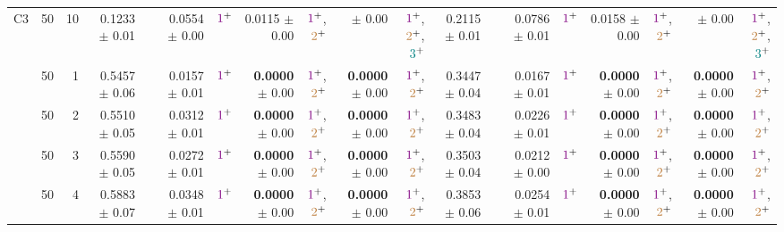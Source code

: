 \begin{table}
\begin{tiny}
\begin{tabular}[t]{rrrrrrrrrrrrrrrrrrr}
\multirow{-10}{*}{\raggedleft\arraybackslash C3} & 50 & 10 & 0.1233 $\pm$ 0.01 &  & 0.0554 $\pm$ 0.00 & $\textcolor{violet}{1}^{+}$ & 0.0115 $\pm$ 0.00 & $\textcolor{violet}{1}^{+}$,$\textcolor{brown}{2}^{+}$ & \cellcolor{gray!0}{\textbf{0.0075}} $\pm$ 0.00 & $\textcolor{violet}{1}^{+}$,$\textcolor{brown}{2}^{+}$,$\textcolor{teal}{3}^{+}$ & 0.2115 $\pm$ 0.01 &  & 0.0786 $\pm$ 0.01 & $\textcolor{violet}{1}^{+}$ & 0.0158 $\pm$ 0.00 & $\textcolor{violet}{1}^{+}$,$\textcolor{brown}{2}^{+}$ & \cellcolor{gray!0}{\textbf{0.0127}} $\pm$ 0.00 & $\textcolor{violet}{1}^{+}$,$\textcolor{brown}{2}^{+}$,$\textcolor{teal}{3}^{+}$\\
\cmidrule{1-19}
 & 50 & 1 & 0.5457 $\pm$ 0.06 &  & 0.0157 $\pm$ 0.01 & $\textcolor{violet}{1}^{+}$ & \textbf{0.0000} $\pm$ 0.00 & $\textcolor{violet}{1}^{+}$,$\textcolor{brown}{2}^{+}$ & \textbf{0.0000} $\pm$ 0.00 & $\textcolor{violet}{1}^{+}$,$\textcolor{brown}{2}^{+}$ & 0.3447 $\pm$ 0.04 &  & 0.0167 $\pm$ 0.01 & $\textcolor{violet}{1}^{+}$ & \textbf{0.0000} $\pm$ 0.00 & $\textcolor{violet}{1}^{+}$,$\textcolor{brown}{2}^{+}$ & \textbf{0.0000} $\pm$ 0.00 & $\textcolor{violet}{1}^{+}$,$\textcolor{brown}{2}^{+}$\\

 & 50 & 2 & 0.5510 $\pm$ 0.05 &  & 0.0312 $\pm$ 0.01 & $\textcolor{violet}{1}^{+}$ & \textbf{0.0000} $\pm$ 0.00 & $\textcolor{violet}{1}^{+}$,$\textcolor{brown}{2}^{+}$ & \textbf{0.0000} $\pm$ 0.00 & $\textcolor{violet}{1}^{+}$,$\textcolor{brown}{2}^{+}$ & 0.3483 $\pm$ 0.04 &  & 0.0226 $\pm$ 0.01 & $\textcolor{violet}{1}^{+}$ & \textbf{0.0000} $\pm$ 0.00 & $\textcolor{violet}{1}^{+}$,$\textcolor{brown}{2}^{+}$ & \textbf{0.0000} $\pm$ 0.00 & $\textcolor{violet}{1}^{+}$,$\textcolor{brown}{2}^{+}$\\

 & 50 & 3 & 0.5590 $\pm$ 0.05 &  & 0.0272 $\pm$ 0.01 & $\textcolor{violet}{1}^{+}$ & \textbf{0.0000} $\pm$ 0.00 & $\textcolor{violet}{1}^{+}$,$\textcolor{brown}{2}^{+}$ & \textbf{0.0000} $\pm$ 0.00 & $\textcolor{violet}{1}^{+}$,$\textcolor{brown}{2}^{+}$ & 0.3503 $\pm$ 0.04 &  & 0.0212 $\pm$ 0.00 & $\textcolor{violet}{1}^{+}$ & \textbf{0.0000} $\pm$ 0.00 & $\textcolor{violet}{1}^{+}$,$\textcolor{brown}{2}^{+}$ & \textbf{0.0000} $\pm$ 0.00 & $\textcolor{violet}{1}^{+}$,$\textcolor{brown}{2}^{+}$\\

 & 50 & 4 & 0.5883 $\pm$ 0.07 &  & 0.0348 $\pm$ 0.01 & $\textcolor{violet}{1}^{+}$ & \textbf{0.0000} $\pm$ 0.00 & $\textcolor{violet}{1}^{+}$,$\textcolor{brown}{2}^{+}$ & \textbf{0.0000} $\pm$ 0.00 & $\textcolor{violet}{1}^{+}$,$\textcolor{brown}{2}^{+}$ & 0.3853 $\pm$ 0.06 &  & 0.0254 $\pm$ 0.01 & $\textcolor{violet}{1}^{+}$ & \textbf{0.0000} $\pm$ 0.00 & $\textcolor{violet}{1}^{+}$,$\textcolor{brown}{2}^{+}$ & \textbf{0.0000} $\pm$ 0.00 & $\textcolor{violet}{1}^{+}$,$\textcolor{brown}{2}^{+}$\\


\end{tabular}
\end{tiny}
\end{table}
